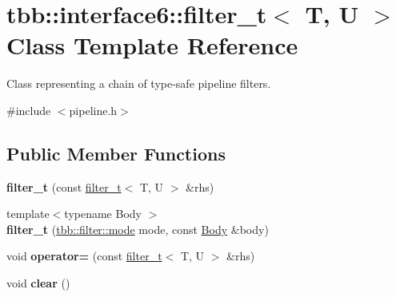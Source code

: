 \hypertarget{classtbb_1_1interface6_1_1filter__t}{}\section{tbb\+:\+:interface6\+:\+:filter\+\_\+t$<$ T, U $>$ Class Template Reference}
\label{classtbb_1_1interface6_1_1filter__t}


Class representing a chain of type-\/safe pipeline filters.  




{\ttfamily \#include $<$pipeline.\+h$>$}

\subsection*{Public Member Functions}
\begin{DoxyCompactItemize}
\item 
\hypertarget{classtbb_1_1interface6_1_1filter__t_a291e76dc7ae92a66109a102904836b62}{}{\bfseries filter\+\_\+t} (const \hyperlink{classtbb_1_1interface6_1_1filter__t}{filter\+\_\+t}$<$ T, U $>$ \&rhs)\label{classtbb_1_1interface6_1_1filter__t_a291e76dc7ae92a66109a102904836b62}

\item 
\hypertarget{classtbb_1_1interface6_1_1filter__t_a86c29832da3f4941254b8dce9e1ff6f0}{}{\footnotesize template$<$typename Body $>$ }\\{\bfseries filter\+\_\+t} (\hyperlink{classtbb_1_1filter_a8145c736bafcf0b401d50bf1a1df9125}{tbb\+::filter\+::mode} mode, const \hyperlink{classBody}{Body} \&body)\label{classtbb_1_1interface6_1_1filter__t_a86c29832da3f4941254b8dce9e1ff6f0}

\item 
\hypertarget{classtbb_1_1interface6_1_1filter__t_ae765b59c54ca11f9cdb9f7f2c6c3bd68}{}void {\bfseries operator=} (const \hyperlink{classtbb_1_1interface6_1_1filter__t}{filter\+\_\+t}$<$ T, U $>$ \&rhs)\label{classtbb_1_1interface6_1_1filter__t_ae765b59c54ca11f9cdb9f7f2c6c3bd68}

\item 
\hypertarget{classtbb_1_1interface6_1_1filter__t_a445602c2d364b5bbcd8cc9e0b7f37376}{}void {\bfseries clear} ()\label{classtbb_1_1interface6_1_1filter__t_a445602c2d364b5bbcd8cc9e0b7f37376}

\end{DoxyCompactItemize}
